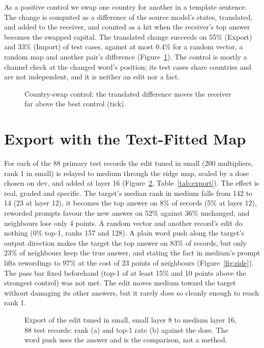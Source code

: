 As a positive control we swap one country for another in a template sentence. The change is computed as a difference of the source model's states, translated, and added to the receiver, and counted as a hit when the receiver's top answer becomes the swapped capital. The translated change succeeds on 55\% (Export) and 33\% (Import) of test cases, against at most 0.4\% for a random vector, a random map and another pair's difference (Figure~\ref{fig:swap}). The control is mostly a channel check at the changed word's position; its test cases share countries and are not independent, and it is neither an edit nor a fact.

\begin{figure}[t]
\centering
{}
\caption{Country-swap control: the translated difference moves the receiver far above the best control (tick).}\label{fig:swap}
\end{figure}

\section{Export with the Text-Fitted Map}\label{sec:export}

For each of the 88 primary test records the edit tuned in small (200 multipliers, rank 1 in small) is relayed to medium through the ridge map, scaled by a dose chosen on dev, and added at layer 16 (Figure~\ref{fig:doses}, Table~\ref{tab:export}). The effect is real, graded and specific. The target's median rank in medium falls from 142 to 14 (23 at layer 12), it becomes the top answer on 8\% of records (5\% at layer 12), reworded prompts favour the new answer on 52\% against 36\% unchanged, and neighbours lose only 4 points. A random vector and another record's edit do nothing (0\% top-1, ranks 157 and 128). A plain word push along the target's output direction makes the target the top answer on 83\% of records, but only 23\% of neighbours keep the true answer, and stating the fact in medium's prompt lifts rewordings to 97\% at the cost of 23 points of neighbours (Figure~\ref{fig:side}). The pass bar fixed beforehand (top-1 of at least 15\% and 10 points above the strongest control) was not met. The edit moves medium toward the target without damaging its other answers, but it rarely does so cleanly enough to reach rank 1.

\begin{figure}[t]
\centering
{}
\caption{Export of the edit tuned in small, small layer 8 to medium layer 16, 88 test records: rank (a) and top-1 rate (b) against the dose. The word push uses the answer and is the comparison, not a method.}\label{fig:doses}
\end{figure}

